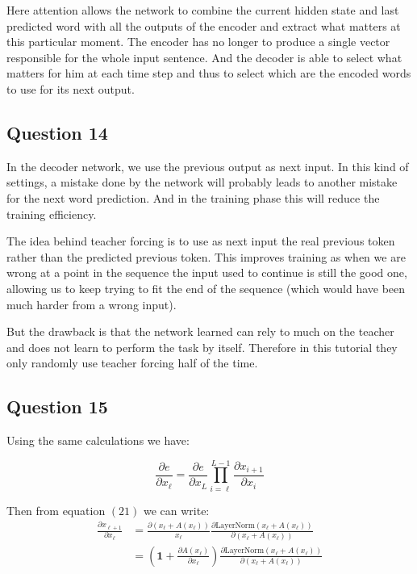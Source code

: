 \documentclass{article}
\begin{document}
Here attention allows the network to combine the current hidden state and last predicted word with all the outputs of the encoder and
extract what matters at this particular moment. The encoder has no longer to produce a single vector responsible for the whole input sentence.
And the decoder is able to select what matters for him at each time step and thus to select which are the encoded words to use for its
next output.

\subsection*{Question 14}
In the decoder network, we use the previous output as next input. In this kind of settings, a mistake done by the network will probably leads
to another mistake for the next word prediction. And in the training phase this will reduce the training efficiency.

The idea behind teacher forcing is to use as next input the real previous token rather than the predicted previous token. This improves
training as when we are wrong at a point in the sequence the input used to continue is still the good one, allowing us to keep trying to fit the
end of the sequence (which would have been much harder from a wrong input).

But the drawback is that the network learned can rely to much on the teacher and does not learn to perform the task by itself.
Therefore in this tutorial they only randomly use teacher forcing half of the time.

\subsection*{Question 15}
Using the same calculations we have:

\begin{equation*}
    \frac{\partial e}{\partial x_\ell} = \frac{\partial e}{\partial x_L} \prod_{i=\ell}^{L-1} \frac{\partial x_{i+1}}{\partial x_i}
\end{equation*}

Then from equation $(21)$ we can write:
\begin{equation}
    \tag{21'}
    \begin{aligned}
        \frac{\partial x_{\ell + 1}}{\partial x_\ell} & = \frac{\partial (x_\ell + A(x_\ell))}{x_\ell}\frac{\partial \text{LayerNorm}(x_\ell + A(x_\ell))}{\partial (x_\ell + A(x_\ell))}                         \\
                                                      & = \left(\mathbf{1} + \frac{\partial A(x_\ell)}{\partial x_\ell}\right)\frac{\partial \text{LayerNorm}(x_\ell + A(x_\ell))}{\partial (x_\ell + A(x_\ell))}
    \end{aligned}
\end{equation}
\end{document}
